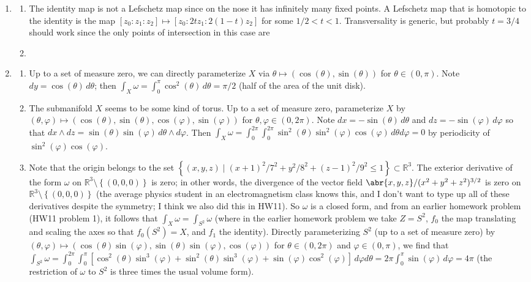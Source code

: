 \documentclass[11pt,leqno]{article}
\theoremstyle{plain}
\theoremstyle{definition}
\numberwithin{equation}{section}
\numberwithin{lem}{section}
\newcommand{\cbr}[1]{\left\{#1\right\}}
\DeclareMathOperator{\id}{id}
\begin{document}
\begin{enumerate}
    \item \begin{enumerate}
        \item The identity map is not a Lefschetz map since on the nose it has infinitely many fixed points. A Lefschetz map that is homotopic to the identity is the map $[z_0:z_1:z_2]\mapsto [z_0:2tz_1:2(1-t)z_2]$ for some $1/2<t<1$. Transversality is generic, but probably $t = 3/4$ should work since the only points of intersection in this case are 
        \item 
    \end{enumerate}
    \item \begin{enumerate}
        \item Up to a set of measure zero, we can directly parameterize $X$ via $\theta\mapsto (\cos(\theta),\sin(\theta))$ for $\theta\in(0,\pi)$. Note $dy = \cos(\theta)\,d\theta$; then $\int_X\omega = \int_0^\pi\cos^2(\theta)\,d\theta = \pi/2$ (half of the area of the unit disk).
        \item The submanifold $X$ seems to be some kind of torus. Up to a set of measure zero, parameterize $X$ by $(\theta,\varphi)\mapsto (\cos(\theta),\sin(\theta),\cos(\varphi), \sin(\varphi))$ for $\theta,\varphi\in(0,2\pi)$. Note $dx = -\sin(\theta)\,d\theta$ and $dz = -\sin(\varphi)\,d\varphi$ so that $dx\wedge dz = \sin(\theta)\sin(\varphi)\,d\theta\wedge d\varphi$. Then $\int_X\omega = \int_0^{2\pi}\int_0^{2\pi}\sin^2(\theta)\sin^2(\varphi)\cos(\varphi)\,d\theta d\varphi = 0$ by periodicity of $\sin^2(\varphi)\cos(\varphi)$.
        \item Note that the origin belongs to the set $\cbr{(x,y,z)\mid (x+1)^2/7^2 + y^2/8^2 + (z-1)^2/9^2 \leq 1}\subset \mathbb R^3$. The exterior derivative of the form $\omega$ on $\mathbb R^3\setminus \cbr{(0,0,0)}$ is zero; in other words, the divergence of the vector field $\abr{x,y,z}/(x^2+y^2+z^2)^{3/2}$ is zero on $\mathbb R^3\setminus \cbr{(0,0,0)}$ (the average physics student in an electromagnetism class knows this, and I don't want to type up all of these derivatives despite the symmetry; I think we also did this in HW11). So $\omega$ is a closed form, and from an earlier homework problem (HW11 problem 1), it follows that $\int_X\omega = \int_{S^2}\omega$ (where in the earlier homework problem we take $Z = S^2$, $f_0$ the map translating and scaling the axes so that $f_0(S^2) = X$, and $f_1$ the identity). Directly parameterizing $S^2$ (up to a set of measure zero) by $(\theta,\varphi)\mapsto (\cos(\theta)\sin(\varphi),\sin(\theta)\sin(\varphi),\cos(\varphi))$ for $\theta\in (0,2\pi)$ and $\varphi\in (0,\pi)$, we find that $\int_{S^2}\omega = \int_0^{2\pi}\int_0^\pi [\cos^2(\theta)\sin^3(\varphi) + \sin^2(\theta)\sin^3(\varphi) + \sin(\varphi)\cos^2(\varphi)] \,d\varphi d\theta = 2\pi\int_0^\pi\sin(\varphi)\,d\varphi = 4\pi$ (the restriction of $\omega$ to $S^2$ is three times the usual volume form).

\end{enumerate}
\end{enumerate}
\end{document}
